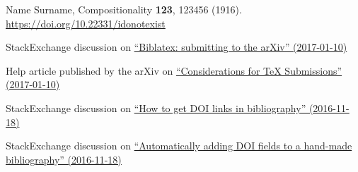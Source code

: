 \documentclass[
    accepted=2020-05-01,
    published=true,
    issue=1, 
    volume=2, 
    a4paper,
]{compositionalityarticle}
\begin{document}

\begin{thebibliography}{9}
  Name Surname,
  Compositionality \textbf{123}, 123456 (1916).
  \href{https://doi.org/10.22331/idonotexist}
       {https://doi.org/10.22331/idonotexist}

  StackExchange discussion on \href{http://tex.stackexchange.com/questions/26990/biblatex-submitting-to-the-arxiv}{``Biblatex: submitting to the arXiv'' (2017-01-10)}

  Help article published by the arXiv on \href{https://arxiv.org/help/submit_tex}{``Considerations for TeX Submissions'' (2017-01-10)}

  StackExchange discussion on \href{http://tex.stackexchange.com/questions/3802/how-to-get-doi-links-in-bibliography}{``How to get DOI links in bibliography'' (2016-11-18)}
  
  StackExchange discussion on \href{http://tex.stackexchange.com/questions/6810/automatically-adding-doi-fields-to-a-hand-made-bibliography}{``Automatically adding DOI fields to a hand-made bibliography'' (2016-11-18)}

\end{thebibliography}



\onecolumn\newpage
\end{document}
